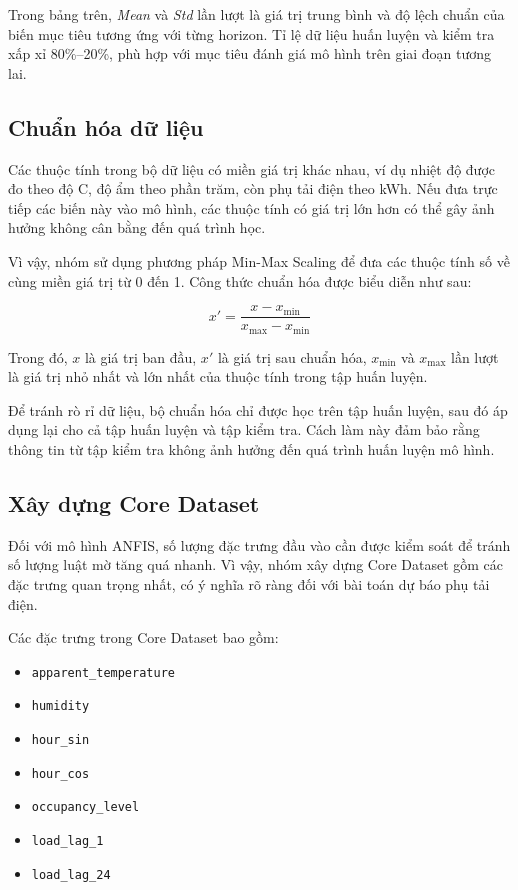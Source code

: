 Trong bảng trên, \textit{Mean} và \textit{Std} lần lượt là giá trị trung bình và độ lệch chuẩn của biến mục tiêu tương ứng với từng horizon. Tỉ lệ dữ liệu huấn luyện và kiểm tra xấp xỉ 80\%--20\%, phù hợp với mục tiêu đánh giá mô hình trên giai đoạn tương lai.

\subsection{Chuẩn hóa dữ liệu}

Các thuộc tính trong bộ dữ liệu có miền giá trị khác nhau, ví dụ nhiệt độ được đo theo độ C, độ ẩm theo phần trăm, còn phụ tải điện theo kWh. Nếu đưa trực tiếp các biến này vào mô hình, các thuộc tính có giá trị lớn hơn có thể gây ảnh hưởng không cân bằng đến quá trình học.

Vì vậy, nhóm sử dụng phương pháp Min-Max Scaling để đưa các thuộc tính số về cùng miền giá trị từ 0 đến 1. Công thức chuẩn hóa được biểu diễn như sau:

\begin{equation}
x' = \frac{x - x_{\min}}{x_{\max} - x_{\min}}
\end{equation}

Trong đó, $x$ là giá trị ban đầu, $x'$ là giá trị sau chuẩn hóa, $x_{\min}$ và $x_{\max}$ lần lượt là giá trị nhỏ nhất và lớn nhất của thuộc tính trong tập huấn luyện.

Để tránh rò rỉ dữ liệu, bộ chuẩn hóa chỉ được học trên tập huấn luyện, sau đó áp dụng lại cho cả tập huấn luyện và tập kiểm tra. Cách làm này đảm bảo rằng thông tin từ tập kiểm tra không ảnh hưởng đến quá trình huấn luyện mô hình.

\subsection{Xây dựng Core Dataset}

Đối với mô hình ANFIS, số lượng đặc trưng đầu vào cần được kiểm soát để tránh số lượng luật mờ tăng quá nhanh. Vì vậy, nhóm xây dựng Core Dataset gồm các đặc trưng quan trọng nhất, có ý nghĩa rõ ràng đối với bài toán dự báo phụ tải điện.

Các đặc trưng trong Core Dataset bao gồm:

\begin{itemize}
\item \texttt{apparent\_temperature}
\item \texttt{humidity}
\item \texttt{hour\_sin}
\item \texttt{hour\_cos}
\item \texttt{occupancy\_level}
\item \texttt{load\_lag\_1}
\item \texttt{load\_lag\_24}
\end{itemize}

